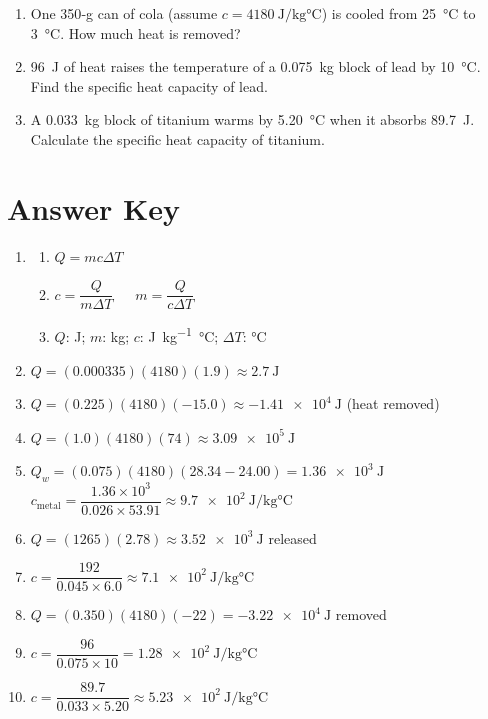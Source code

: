 \documentclass{article}
\begin{document}
\begin{enumerate}
\item One 350‑g can of cola (assume $c=\SI{4180}{\joule\per\kilogram\celsius}$) is cooled from \SI{25}{\degreeCelsius} to \SI{3}{\degreeCelsius}. How much heat is removed?

\item \SI{96}{\joule} of heat raises the temperature of a \SI{0.075}{\kilogram} block of lead by \SI{10}{\degreeCelsius}. Find the specific heat capacity of lead.

\item A \SI{0.033}{\kilogram} block of titanium warms by \SI{5.20}{\degreeCelsius} when it absorbs \SI{89.7}{\joule}. Calculate the specific heat capacity of titanium.
\end{enumerate}

\newpage
\section*{Answer Key}

\begin{enumerate}
\item 
\begin{enumerate}
    \item $Q = mc\Delta T$
    \item $c = \dfrac{Q}{m\Delta T} \quad\;\; m = \dfrac{Q}{c\Delta T}$
    \item $Q$: \si{\joule}; $m$: \si{\kilogram}; $c$: \si{\joule\per\kilogram\celsius}; $\Delta T$: \si{\celsius}
\end{enumerate}

\item $Q = (0.000335)(4180)(1.9) \approx \SI{2.7}{\joule}$

\item $Q = (0.225)(4180)(-15.0) \approx \SI{-1.41e4}{\joule}$ (heat removed)

\item $Q = (1.0)(4180)(74) \approx \SI{3.09e5}{\joule}$

\item $Q_w = (0.075)(4180)(28.34-24.00)=\SI{1.36e3}{\joule}$\\
$c_\text{metal}= \dfrac{1.36\times10^{3}}{0.026\times53.91}\approx \SI{9.7e2}{\joule\per\kilogram\celsius}$

\item $Q = (1265)(2.78) \approx \SI{3.52e3}{\joule}$ released

\item $c = \dfrac{192}{0.045\times6.0}\approx \SI{7.1e2}{\joule\per\kilogram\celsius}$

\item $Q = (0.350)(4180)(-22)=\SI{-3.22e4}{\joule}$ removed

\item $c = \dfrac{96}{0.075\times10}=\SI{1.28e2}{\joule\per\kilogram\celsius}$

\item $c = \dfrac{89.7}{0.033\times5.20}\approx \SI{5.23e2}{\joule\per\kilogram\celsius}$
\end{enumerate}
\end{document}

